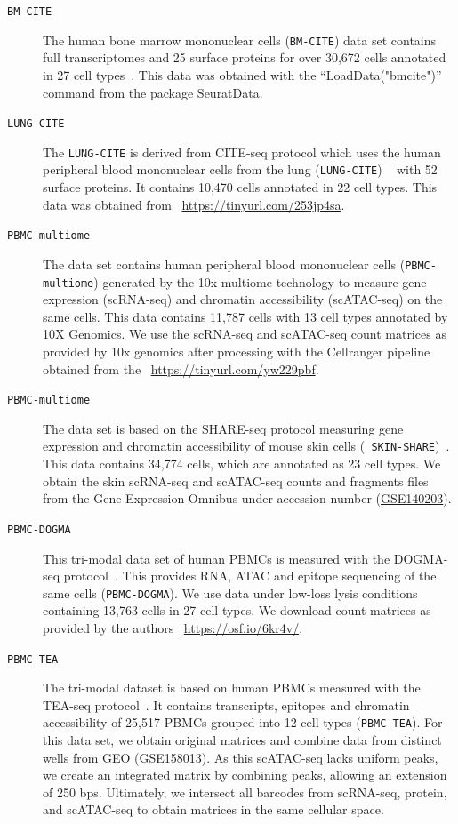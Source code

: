 \begin{description}
	\item[{\texttt{BM-CITE}}]
	The human bone marrow mononuclear cells ({\texttt{BM-CITE}}) data set contains full transcriptomes and 25 surface proteins for over 30,672 cells annotated in 27 cell types~\citep{hao2021seurat4}. This data was obtained with the ``LoadData("bmcite")'' command from the package SeuratData. 

	\item[{\texttt{LUNG-CITE}}]
	The \texttt{LUNG-CITE} is derived from CITE-seq protocol which uses the human peripheral blood mononuclear cells from the lung ({\texttt{LUNG-CITE}}) ~\citep{buus2021improving} with 52 surface proteins. It contains 10,470 cells annotated in 22 cell types. This data was obtained from ~\url{https://tinyurl.com/253jp4sa}.

	\item[{\texttt{PBMC-multiome}}]
  	The data set contains human peripheral blood mononuclear cells ({\texttt{PBMC-multiome}}) generated by the 10x multiome technology to measure gene expression (scRNA-seq) and chromatin accessibility (scATAC-seq) on the same cells. This data contains 11,787 cells with 13 cell types annotated by 10X Genomics.  We use the scRNA-seq and scATAC-seq count matrices as provided by 10x genomics after processing with the Cellranger pipeline obtained from the ~\url{https://tinyurl.com/yw229pbf}.

	\item[{\texttt{PBMC-multiome}}]
	The data set is based on the SHARE-seq protocol measuring gene expression and chromatin accessibility of mouse skin cells ({\texttt{ SKIN-SHARE}})~\citep{ma2020shareseq}. This data contains 34,774 cells, which are annotated as 23 cell types. We obtain the skin scRNA-seq and scATAC-seq counts and fragments files from the Gene Expression Omnibus under accession number (\href{https://www.ncbi.nlm.nih.gov/geo/query/acc.cgi?acc=GSE140203}{GSE140203}).

	\item[{\texttt{PBMC-DOGMA}}]
	This tri-modal data set of human PBMCs is measured with the DOGMA-seq protocol~\citep{mimitou2021scalable}. This provides RNA, ATAC and epitope sequencing of the same cells ({\texttt{PBMC-DOGMA}}). We use data under low-loss lysis conditions containing 13,763 cells in 27 cell types. We download count matrices as provided by the authors ~\url{https://osf.io/6kr4v/}.

	\item[{\texttt{PBMC-TEA}}]
	The tri-modal dataset is based on human PBMCs measured with the TEA-seq protocol~\citep{swanson2021simultaneous}. It contains transcripts, epitopes and chromatin accessibility of 25,517 PBMCs grouped into 12 cell types ({\texttt{PBMC-TEA}}). For this data set, we obtain original matrices and combine data from distinct wells from GEO (GSE158013). As this scATAC-seq lacks uniform peaks, we create an integrated matrix by combining peaks, allowing an extension of 250 bps. Ultimately, we intersect all barcodes from scRNA-seq, protein, and scATAC-seq to obtain matrices in the same cellular space.
\end{description}

